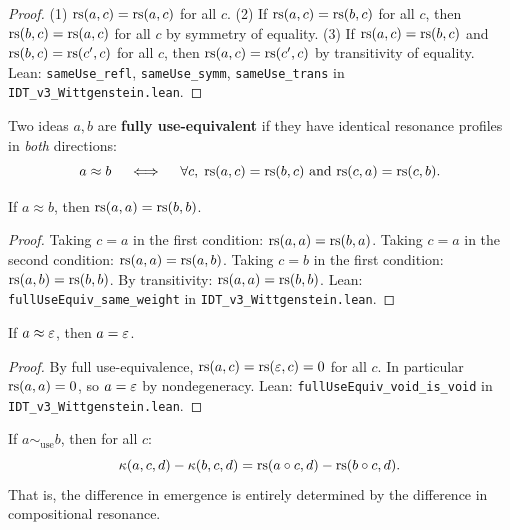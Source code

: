 \begin{proof}
(1) $\mathrm{rs}(a,c) = \mathrm{rs}(a,c)$ for all $c$. (2) If $\mathrm{rs}(a,c) = \mathrm{rs}(b,c)$ for all $c$,
then $\mathrm{rs}(b,c) = \mathrm{rs}(a,c)$ for all $c$ by symmetry of equality. (3) If
$\mathrm{rs}(a,c) = \mathrm{rs}(b,c)$ and $\mathrm{rs}(b,c) = \mathrm{rs}(c',c)$ for all $c$, then
$\mathrm{rs}(a,c) = \mathrm{rs}(c',c)$ by transitivity of equality.
Lean: \texttt{sameUse\_refl}, \texttt{sameUse\_symm}, \texttt{sameUse\_trans}
in \texttt{IDT\_v3\_Wittgenstein.lean}.
\end{proof}

\begin{definition}
\label{def:full-use-equiv}
Two ideas $a, b$ are \textbf{fully use-equivalent} if they have identical
resonance profiles in \emph{both} directions:
\[
a \approx b \quad \iff \quad \forall c,\; \mathrm{rs}(a,c) = \mathrm{rs}(b,c) \text{ and } \mathrm{rs}(c,a) = \mathrm{rs}(c,b).
\]
\end{definition}

\begin{theorem}
\label{thm:full-use-weight}
If $a \approx b$, then $\mathrm{rs}(a, a) = \mathrm{rs}(b, b)$.
\end{theorem}

\begin{proof}
Taking $c = a$ in the first condition: $\mathrm{rs}(a, a) = \mathrm{rs}(b, a)$. Taking
$c = a$ in the second condition: $\mathrm{rs}(a, a) = \mathrm{rs}(a, b)$. Taking $c = b$
in the first condition: $\mathrm{rs}(a, b) = \mathrm{rs}(b, b)$. By transitivity:
$\mathrm{rs}(a, a) = \mathrm{rs}(b, b)$.
Lean: \texttt{fullUseEquiv\_same\_weight} in \texttt{IDT\_v3\_Wittgenstein.lean}.
\end{proof}

\begin{theorem}
\label{thm:full-void-equiv}
If $a \approx \varepsilon$, then $a = \varepsilon$.
\end{theorem}

\begin{proof}
By full use-equivalence, $\mathrm{rs}(a, c) = \mathrm{rs}(\varepsilon, c) = 0$ for all $c$.
In particular $\mathrm{rs}(a, a) = 0$, so $a = \varepsilon$ by nondegeneracy.
Lean: \texttt{fullUseEquiv\_void\_is\_void} in \texttt{IDT\_v3\_Wittgenstein.lean}.
\end{proof}

\begin{theorem}
\label{thm:connotation-invariance}
If $a \sim_{\mathrm{use}} b$, then for all $c$:
\[
\kappa(a, c, d) - \kappa(b, c, d) = \mathrm{rs}(a \circ c, d) - \mathrm{rs}(b \circ c, d).
\]
That is, the difference in emergence is entirely determined by the difference
in compositional resonance.
\end{theorem}

